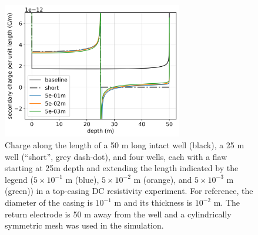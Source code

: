\begin{figure}
    \begin{center}
    \includegraphics[width=0.7\textwidth]{figures/casing_charge_flawdz.png}
    \end{center}
\caption{
    Charge along the length of a 50 m long intact well (black),
    a 25 m well (``short'', grey dash-dot), and four wells, each with a flaw
    starting at 25m depth and extending the length indicated by the legend
    ($5 \times 10^{-1}$ m (blue), $5 \times 10^{-2}$ m (orange), and $5 \times 10^{-3}$ m (green))
    in a top-casing DC resistivity experiment.
    For reference, the diameter of the casing is $10^{-1}$ m and its thickness is $10^{-2}$ m.
    The return electrode
    is 50 m away from the well and a cylindrically symmetric mesh was used in the simulation.
}
\label{fig:casing_charge_flawdz}
\end{figure}

